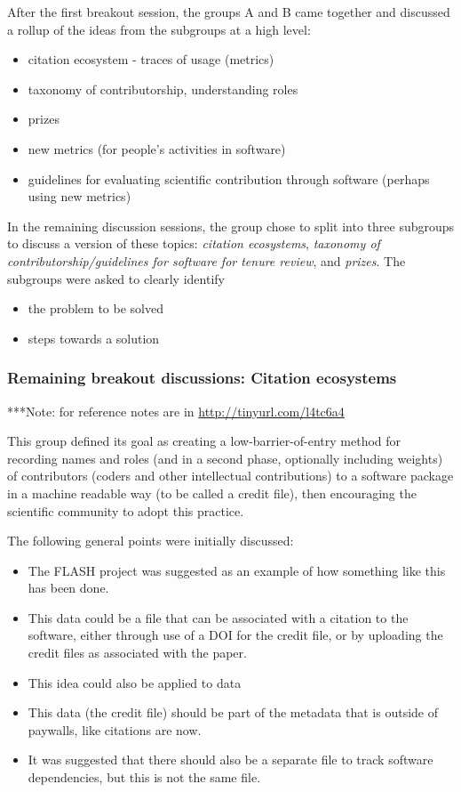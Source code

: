 \documentclass[11pt, oneside]{amsart}
\newcommand{\note}[1]{ {\textcolor{blueish}    { ***Note:      #1 }}}
\begin{document}
After the first breakout session, the groups A and B came together and discussed 
a rollup of the ideas from the subgroups at a high level:
\begin{itemize}
\item citation ecosystem - traces of usage (metrics)
\item taxonomy of contributorship, understanding roles
\item prizes
\item new metrics (for people's activities in software)
\item guidelines for evaluating scientific contribution through software (perhaps using new metrics)
\end{itemize}

In the remaining discussion sessions, the group chose to split into three subgroups to discuss
a version of these topics: {\em citation ecosystems},
{\em taxonomy of contributorship/guidelines for software for tenure review}, and {\em prizes}.  The subgroups were asked to clearly identify
\begin{itemize}
\item the problem to be solved
\item steps towards a solution
\end{itemize}



\subsubsection{Remaining breakout discussions: Citation ecosystems}

\note{for reference notes are in \url{http://tinyurl.com/l4tc6a4}}

This group defined its goal as creating a low-barrier-of-entry method for recording names and roles (and in a second phase, optionally including weights) of contributors (coders and other intellectual contributions) to a software package in a machine readable way (to be called a credit file), then encouraging the scientific community to adopt this practice. 

The following general points were initially discussed: 
\begin{itemize}
\item The FLASH project was suggested as an example of how something like this has been done.
\item This data could be a file that can be associated with a citation to the software, either through use of a DOI for the credit file, or by uploading the credit files as associated with the paper.
\item This idea could also be applied to data
\item This data (the credit file) should be part of the metadata that is outside of paywalls, like citations are now.
\item It was suggested that there should also be a separate file to track software dependencies, but this is not the same file.
\end{itemize} 
\end{document}
